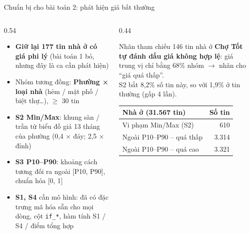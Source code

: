\documentclass[aspectratio=169,11pt]{beamer}
\begin{document}
\begin{frame}{Chuẩn bị cho bài toán 2: phát hiện giá bất thường}
  \begin{columns}[T]
    \begin{column}{0.54\linewidth}
      \footnotesize
      \begin{itemize}
        \item \textbf{Giữ lại 177 tin nhà ở có giá phi lý} (bài toán 1 bỏ, nhưng đây là ca cần phát hiện)
        \item Nhóm tương đồng: \textbf{Phường × loại nhà} (hẻm / mặt phố / biệt thự\dots), $\ge$ 30 tin
        \item \textbf{S2 Min/Max}: khung sàn / trần từ biểu đồ giá 13 tháng của phường (0,4 × đáy; 2,5 × đỉnh)
        \item \textbf{S3 P10--P90}: khoảng cách tương đối ra ngoài [P10, P90], chuẩn hóa [0, 1]
        \item \textbf{S1, S4} cần mô hình: đã có đặc trưng mã hóa sẵn cho mọi dòng, cột \texttt{if\_*}, hàm tính S1 / S4 / điểm tổng hợp
      \end{itemize}
    \end{column}
    \begin{column}{0.44\linewidth}
      \begin{block}{Nhãn tham chiếu}
        \small
        146 tin nhà ở \textbf{Chợ Tốt tự đánh dấu giá không hợp lệ}: giá trung vị chỉ bằng 68\% nhóm $\to$ nhãn cho ``giá quá thấp''.\\[0.3em]
        S2 bắt 8,2\% số tin này, so với 1,9\% ở tin thường (gấp 4 lần).
      \end{block}
      \vspace{0.3em}
      \footnotesize
      \begin{tabular}{@{}lr@{}}
        \toprule
        Nhà ở (31.567 tin) & Số tin \\ \midrule
        Vi phạm Min/Max (S2) & 610 \\
        Ngoài P10--P90 -- quá thấp & 3.314 \\
        Ngoài P10--P90 -- quá cao & 3.321 \\
        \bottomrule
      \end{tabular}
    \end{column}
  \end{columns}
\end{frame}
\end{document}
